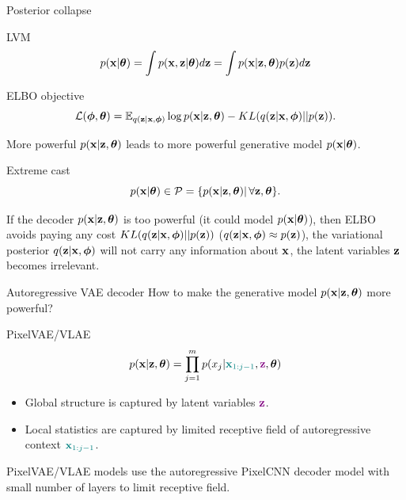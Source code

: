 \documentclass{beamer}
\begin{document}
\begin{frame}{Posterior collapse}
	\begin{block}{LVM}
		\vspace{-0.3cm}
		\[
		p(\mathbf{x} | \boldsymbol{\theta}) = \int p(\mathbf{x}, \mathbf{z} | \boldsymbol{\theta}) d \mathbf{z} = \int p(\mathbf{x} | \mathbf{z}, \boldsymbol{\theta}) p(\mathbf{z}) d \mathbf{z} 
		\]
		\vspace{-0.5cm}
	\end{block}
	\begin{block}{ELBO objective}
		\vspace{-0.3cm}
		\[
		\mathcal{L}(\boldsymbol{\phi}, \boldsymbol{\theta}) = \mathbb{E}_{q(\mathbf{z} | \mathbf{x}, \boldsymbol{\phi})} \log p(\mathbf{x} | \mathbf{z}, \boldsymbol{\theta}) - KL(q(\mathbf{z} | \mathbf{x}, \boldsymbol{\phi}) || p(\mathbf{z})).
		\]
	\end{block}
	More powerful $p(\mathbf{x} | \mathbf{z}, \boldsymbol{\theta})$ leads to more powerful generative model $p(\mathbf{x} | \boldsymbol{\theta})$.
	\begin{block}{Extreme cast}
		\vspace{-0.3cm}
		\[
			p(\mathbf{x} | \boldsymbol{\theta}) \in \mathcal{P} = \{ p(\mathbf{x} | \mathbf{z}, \boldsymbol{\theta}) | \, \forall \mathbf{z}, \boldsymbol{\theta}\}.
		\]
	\end{block}
	If the decoder $p(\mathbf{x} | \mathbf{z}, \boldsymbol{\theta})$ is too powerful (it could  model $p(\mathbf{x} | \boldsymbol{\theta})$), then ELBO avoids paying any cost $KL(q(\mathbf{z}| \mathbf{x}, \boldsymbol{\phi})||p(\mathbf{z}))$ ($q(\mathbf{z}| \mathbf{x}, \boldsymbol{\phi}) \approx p(\mathbf{z})$), the variational posterior $q(\mathbf{z} | \mathbf{x}, \boldsymbol{\phi})$ will not carry any information about $\mathbf{x}$, the latent variables $\mathbf{z}$ becomes irrelevant.
\end{frame}
\begin{frame}{Autoregressive VAE decoder}
	How to make the generative model $p(\mathbf{x} | \mathbf{z}, \boldsymbol{\theta})$ more powerful?
	\begin{block}{PixelVAE/VLAE}
		\vspace{-0.3cm}
		\[
			p(\mathbf{x} | \mathbf{z} , \boldsymbol{\theta}) = \prod_{j=1}^m p(x_j | {\color{teal}\mathbf{x}_{1:j - 1}}, {\color{violet}\mathbf{z}}, \boldsymbol{\theta})
		\]
		\begin{itemize}
			\item Global structure is captured by latent variables ${\color{violet}\mathbf{z}}$.
			\item Local statistics are captured by limited receptive field of autoregressive context ${\color{teal}\mathbf{x}_{1:j - 1}}$.
		\end{itemize}
	\end{block}
	PixelVAE/VLAE models use the autoregressive PixelCNN decoder model with small number of layers to limit receptive field.
\end{frame}
\end{document}
